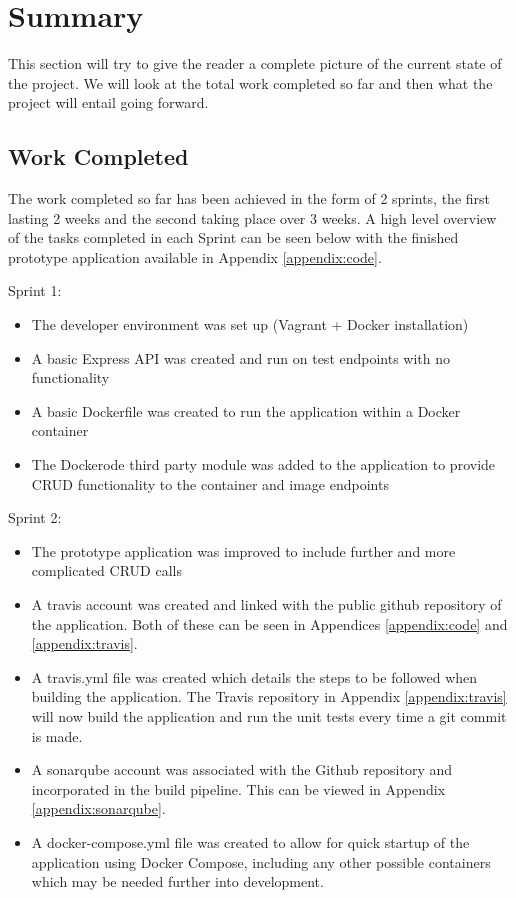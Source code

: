 \section{Summary}
This section will try to give the reader a complete picture of the current state of the project. We will look at the total work completed so far and then what the project will entail going forward.

\subsection{Work Completed}
\label{sub:work_done}
The work completed so far has been achieved in the form of 2 sprints, the first lasting 2 weeks and the second taking place over 3 weeks. A high level overview of the tasks completed in each Sprint can be seen below with the finished prototype application available in Appendix \ref{appendix:code}.

Sprint 1:
\begin{itemize}
	\item The developer environment was set up (Vagrant + Docker installation)
	\item A basic Express \gls{API} was created and run on test endpoints with no functionality
	\item A basic Dockerfile was created to run the application within a Docker container
	\item The Dockerode third party module was added to the application to provide \gls{CRUD} functionality to the container and image endpoints
\end{itemize} 

Sprint 2:
\begin{itemize}
	\item The prototype application was improved to include further and more complicated \gls{CRUD} calls
	\item A \gls{travis} account was created and linked with the public \gls{github} repository of the application. Both of these can be seen in Appendices \ref{appendix:code} and \ref{appendix:travis}.
	\item A travis.yml file was created which details the steps to be followed when building the application. The Travis repository in Appendix \ref{appendix:travis} will now build the application and run the unit tests every time a \gls{git} commit is made.
	\item A \gls{sonarqube} account was associated with the Github repository and incorporated in the build pipeline. This can be viewed in Appendix \ref{appendix:sonarqube}.
	\item A docker-compose.yml file was created to allow for quick startup of the application using \gls{Docker Compose}, including any other possible containers which may be needed further into development.
\end{itemize}

